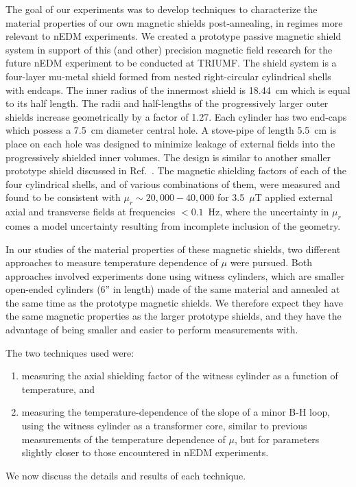 \documentclass[review]{elsarticle}
\begin{document}
The goal of our experiments was to develop techniques to characterize
the material properties of our own magnetic shields post-annealing, in
regimes more relevant to nEDM experiments.  We created a prototype
passive magnetic shield system in support of this (and other)
precision magnetic field research for the future nEDM experiment to be
conducted at TRIUMF.  The shield system is a four-layer mu-metal
shield formed from nested right-circular cylindrical shells with
endcaps.  The inner radius of the innermost shield is 18.44~cm which
is equal to its half length. The radii and half-lengths of the
progressively larger outer shields increase geometrically by a factor
of 1.27.  Each cylinder has two end-caps which possess a 7.5~cm
diameter central hole.  A stove-pipe of length 5.5~cm is place on each
hole was designed to minimize leakage of external fields into the
progressively shielded inner volumes.  The design is similar to
another smaller prototype shield discussed in
Ref.~\cite{bib:nmorpaper}.  The magnetic shielding factors of each of
the four cylindrical shells, and of various combinations of them, were
measured and found to be consistent with $\mu_r\sim 20,000-40,000$ for
3.5~$\mu$T applied external axial and transverse fields at frequencies
$<0.1$~Hz, where the uncertainty in $\mu_r$ comes a model uncertainty
resulting from incomplete inclusion of the geometry.


In our studies of the material properties of these magnetic shields,
two different approaches to measure temperature dependence of $\mu$
were pursued.  Both approaches involved experiments done using witness
cylinders, which are smaller open-ended cylinders (6'' in length) made
of the same material and annealed at the same time as the prototype
magnetic shields.  We therefore expect they have the same magnetic
properties as the larger prototype shields, and they have the
advantage of being smaller and easier to perform measurements with.



The two techniques used were:
\begin{enumerate}
\item measuring the axial shielding factor of the witness cylinder as
  a function of temperature, and
\item measuring the temperature-dependence of the slope of a minor B-H
  loop, using the witness cylinder as a transformer core, similar to
  previous measurements of the temperature dependence of $\mu$, but
  for parameters slightly closer to those encountered in nEDM
  experiments.
\end{enumerate}
We now discuss the details and results of each technique.
\end{document}
